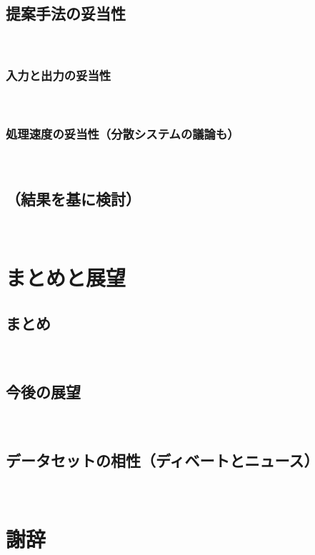 \documentclass[12pt,a4j]{jreport}
\begin{document}
\section{提案手法の妥当性}
~

\subsection{入力と出力の妥当性}
~

\subsection{処理速度の妥当性（分散システムの議論も）}
~

\section{（結果を基に検討）}
~

\chapter{まとめと展望}


\section{まとめ}
~

\section{今後の展望}
~%
 \section{データセットの相性（ディベートとニュース）}
~

\chapter*{謝辞}




\end{document}
